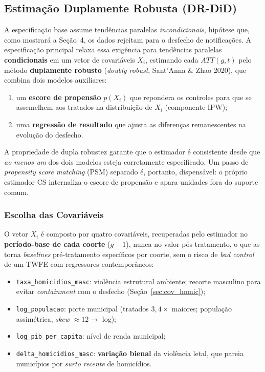 \documentclass[twocolumn, 10pt]{article}
\begin{document}
\subsection{Estimação Duplamente Robusta (DR-DiD)}
\label{sec:dr}

A especificação base assume tendências paralelas \textit{incondicionais},
hipótese que, como mostrará a Seção~4, os dados rejeitam para o desfecho de
notificações. A especificação principal relaxa essa exigência para tendências
paralelas \textbf{condicionais} em um vetor de covariáveis $X_i$, estimando cada
$ATT(g,t)$ pelo método \textbf{duplamente robusto} (\textit{doubly robust},
Sant'Anna \& Zhao 2020), que combina dois modelos auxiliares:
\begin{enumerate}
  \item um \textbf{escore de propensão} $p(X_i)$ que repondera os controles para
        que se assemelhem aos tratados na distribuição de $X_i$ (componente IPW);
  \item uma \textbf{regressão de resultado} que ajusta as diferenças
        remanescentes na evolução do desfecho.
\end{enumerate}

A propriedade de dupla robustez garante que o estimador é consistente desde que
\textit{ao menos um} dos dois modelos esteja corretamente especificado. Um passo
de \textit{propensity score matching} (PSM) separado é, portanto, dispensável: o
próprio estimador CS internaliza o escore de propensão e apara unidades fora do
suporte comum.

\subsubsection{Escolha das Covariáveis}
O vetor $X_i$ é composto por quatro covariáveis, recuperadas pelo estimador no
\textbf{período-base de cada coorte} ($g-1$), nunca no valor pós-tratamento,
o que as torna \textit{baselines} pré-tratamento específicos por coorte, sem o
risco de \textit{bad control} de um TWFE com regressores contemporâneos:

\begin{itemize}
  \item \texttt{taxa\_homicidios\_masc}: violência estrutural ambiente; recorte
        masculino para evitar \textit{containment} com o desfecho (Seção~\ref{sec:cov_homic});
  \item \texttt{log\_populacao}: porte municipal (tratados $3{,}4\times$ maiores;
        população assimétrica, \textit{skew} $\approx 12 \to$ log);
  \item \texttt{log\_pib\_per\_capita}: nível de renda municipal;
  \item \texttt{delta\_homicidios\_masc}: \textbf{variação bienal} da violência
        letal, que pareia municípios por \textit{surto recente} de homicídios.
\end{itemize}
\end{document}
